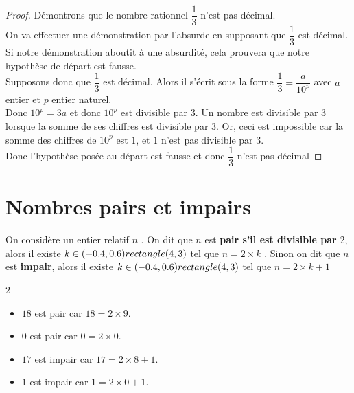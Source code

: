 \begin{proof}
Démontrons que le nombre rationnel $\dfrac{1}{3}$ n'est pas décimal.\\
On va effectuer une démonstration par l'absurde en supposant que $\dfrac{1}{3}$ est décimal.\\
Si notre démonstration aboutit à une absurdité, cela prouvera que notre hypothèse de départ est fausse. \\

\noindent Supposons donc que $\dfrac{1}{3}$ est décimal. 
Alors il s'écrit sous la forme  $\dfrac{1}{3}=\dfrac{a}{10^p}$ avec $a$ entier et $p$ entier naturel. \\

\noindent Donc $10^p = 3a$ et donc $10^p$ est divisible par $3$.
Un nombre est divisible par $3$ lorsque la somme de ses chiffres est divisible par $3$.
Or, ceci est impossible car la somme des chiffres de $10^p$ est $1$, et $1$ n'est pas divisible par $3$.\\
Donc l'hypothèse posée au départ est fausse et donc $\dfrac{1}{3}$ n'est pas décimal
\end{proof}

\newpage

\section{Nombres pairs et impairs}
\begin{Définition}
On considère un entier relatif $n$ .
On dit que $n$ est {\bf{pair s'il est divisible par}} $2$, alors il existe $k\in (-0.4,0.6) rectangle (4,3)$ tel que $n=2\times k$ .
Sinon on dit que $n$ est {\bf{impair}}, alors il existe $k\in (-0.4,0.6) rectangle (4,3)$ tel que $n=2\times k +1$
\end{Définition}
\begin{Exemple}
\leavevmode\vspace{-\baselineskip}
\begin{multicols}{2}
\begin{itemize}[label=\textcolor{Couleur8}{$\bullet$}]
\item $18$ est pair car $18=2\times 9$.
\item $0$ est pair car $0=2\times 0$.
\item $17$ est impair car $17=2\times 8+1$.
\item $1$ est impair car $1=2\times 0 +1$.
\end{itemize}
\end{multicols}
\end{Exemple}


